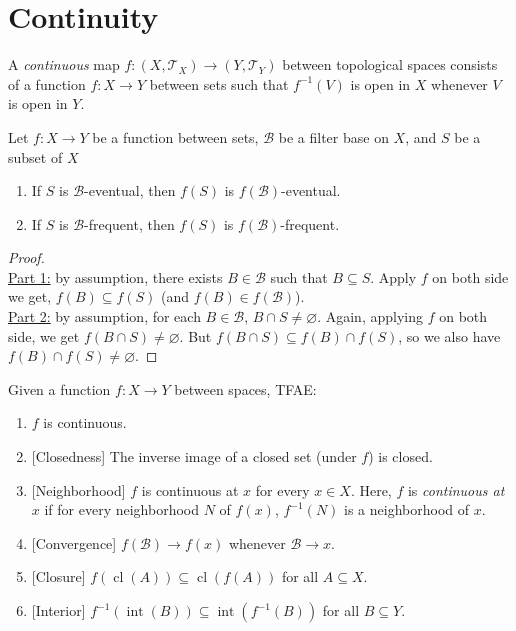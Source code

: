 \documentclass{treatise}
\begin{document}
\section{Continuity}
A \emph{continuous} map $f: (X, \mathcal{T}_X) \to (Y, \mathcal{T}_Y)$ between topological spaces consists of a function $f: X \to Y$ between sets such that $f^{-1}(V)$ is open in $X$ whenever $V$ is open in $Y$.
\begin{proposition} \label{img-event-freq}
Let $f: X \to Y$ be a function between sets, $\mathcal{B}$ be a filter base on $X$, and $S$ be a subset of $X$
\begin{enumerate}
    \item If $S$ is $\mathcal{B}$-eventual, then $f(S)$ is $f(\mathcal{B})$-eventual.
    \item If $S$ is $\mathcal{B}$-frequent, then $f(S)$ is $f(\mathcal{B})$-frequent.
\end{enumerate}
\end{proposition}
\begin{proof} \ \\
\underline{Part 1:} by assumption, there exists $B \in \mathcal{B}$ such that $B \subseteq S$. Apply $f$ on both side we get, $f(B) \subseteq f(S)$ (and $f(B) \in f(\mathcal{B})$).
\\
\underline{Part 2:} by assumption, for each $B \in \mathcal{B}$, $B \cap S \neq \varnothing$. Again, applying $f$ on both side, we get $f(B \cap S) \neq \varnothing$. But $f(B \cap S) \subseteq f(B) \cap f(S)$, so we also have $f(B) \cap f(S) \neq \varnothing$.
\end{proof}
\begin{theorem} \label{cont-equiv-def}
Given a function $f: X \to Y$ between spaces, TFAE:
\begin{enumerate}
    \item $f$ is continuous.
    \item {[Closedness]} The inverse image of a closed set (under $f$) is closed.
    \item {[Neighborhood]} $f$ is continuous at $x$ for every $x \in X$. Here, $f$ is \emph{continuous at} $x$ if for every neighborhood $N$ of $f(x)$, $f^{-1}(N)$ is a neighborhood of $x$.
    \item {[Convergence]} $f(\mathcal{B}) \to f(x)$ whenever $\mathcal{B} \to x$.
    \item {[Closure]} $f(\operatorname{cl}(A)) \subseteq \operatorname{cl}(f(A))$ for all $A \subseteq X$.
    \item {[Interior]} $f^{-1}(\operatorname{int}(B)) \subseteq \operatorname{int}(f^{-1}(B))$ for all $B \subseteq Y$.
\end{enumerate}
\end{theorem}
\end{document}
